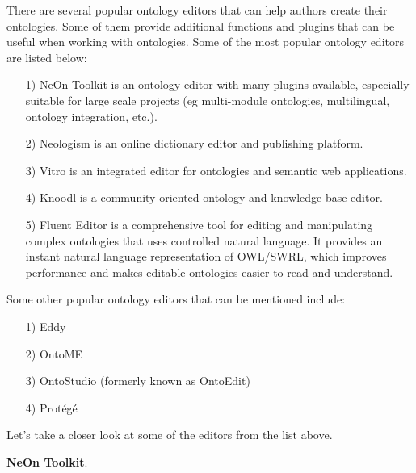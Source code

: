 \documentclass[a4paper,10pt,twocolumn]{article}
\begin{document}
There are several popular ontology editors that can
help authors create their ontologies. Some of them provide
additional functions and plugins that can be useful
when working with ontologies. Some of the most popular
ontology editors are listed below:
\begin{enumerate} 
\item[1)] {NeOn Toolkit is an ontology editor with many
plugins available, especially suitable for large
scale projects (eg multi-module ontologies, multilingual,
ontology integration, etc.).}
\item[2)]{Neologism is an online dictionary editor and publishing
platform.}
\item[3)]{Vitro is an integrated editor for ontologies and
semantic web applications.}
\item[4)]{Knoodl is a community-oriented ontology and
knowledge base editor.}
\item[5)]{Fluent Editor is a comprehensive tool for editing and manipulating complex ontologies
	that uses controlled natural language. It provides an instant
	natural language representation of OWL/SWRL,
	which improves performance and makes editable
	ontologies easier to read and understand.}
\end{enumerate}

Some other popular ontology editors that can be mentioned
include:
\begin{enumerate}
	\item[1)] {Eddy}
	\item[2)] {OntoME}
	\item[3)] {OntoStudio (formerly known as OntoEdit)}
	\item[4)] {Protégé}
\end{enumerate}

Let’s take a closer look at some of the editors from
the list above.

\textbf{NeOn Toolkit}.
\end{document}
